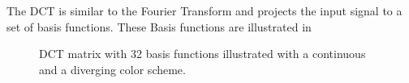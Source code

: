 The DCT is similar to the Fourier Transform and projects the input signal to a set of basis functions. 
These Basis functions are illustrated in 
\begin{figure}[!ht]
  \centering
  \quad
  \caption{DCT matrix with 32 basis functions illustrated with a continuous and a diverging color scheme.}
  \label{fig:dct}
\end{figure}
\FloatBarrier
\noindent


